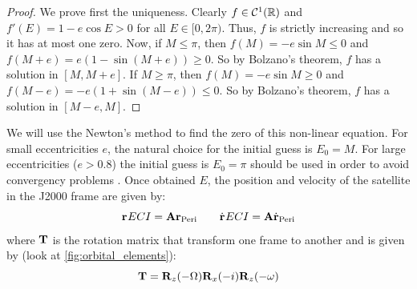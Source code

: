 \documentclass[../main.tex]{subfiles}
\begin{document}
\begin{proof}
  We prove first the uniqueness. Clearly $f\in\mathcal{C}^1(\mathbb{R})$ and $f'(E)=1-e\cos E> 0$ for all $E\in[0,2\pi)$. Thus, $f$ is strictly increasing and so it has at most one zero. Now, if $M\leq \pi$, then $f(M)=-e\sin M\leq 0$ and $f(M+e)=e(1-\sin (M+e))\geq 0$. So by Bolzano's theorem, $f$ has a solution in $[M,M+e]$. If $M\geq \pi$, then $f(M)=-e\sin M\geq 0$ and $f(M-e)=-e(1+\sin (M-e))\leq 0$. So by Bolzano's theorem, $f$ has a solution in $[M-e,M]$.
\end{proof}
We will use the Newton's method to find the zero of this non-linear equation. For small eccentricities $e$, the natural choice for the initial guess is $E_0=M$. For large eccentricities ($e>0.8$) the initial guess is $E_0=\pi$ should be used in order to avoid convergency problems \cite{montenbruck}. Once obtained $E$, the position and velocity of the satellite in the J2000 frame are given by:
\begin{equation}
  \boldsymbol{\mathrm{r}}_\mathrm\mathrm{ECI} = \boldsymbol{\mathrm{A}}\boldsymbol{\mathrm{r}}_\mathrm{Peri} \qquad \dot{\boldsymbol{\mathrm{r}}}_\mathrm\mathrm{ECI} = \boldsymbol{\mathrm{A}}\dot{\boldsymbol{\mathrm{r}}}_\mathrm{Peri}
\end{equation}
where $\boldsymbol{\mathrm{T}}$ is the rotation matrix that transform one frame to another and is given by (look at \cref{fig:orbital_elements}):
\begin{equation}
  \boldsymbol{\mathrm{T}}=\boldsymbol{\mathrm{R}}_z(-\Omega)\boldsymbol{\mathrm{R}}_x(-i)\boldsymbol{\mathrm{R}}_z(-\omega)
\end{equation}
\end{document}
